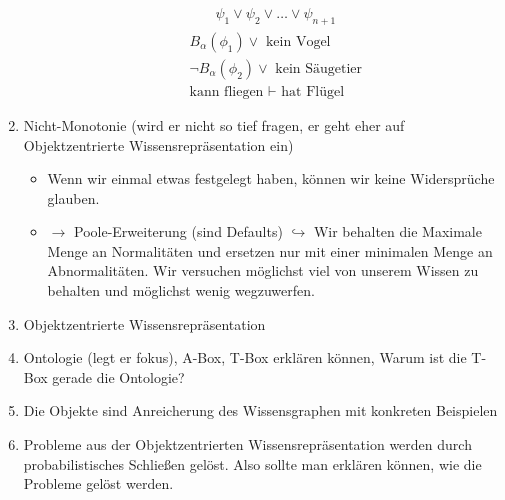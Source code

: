 \documentclass[runningheads,deutsch]{llncs}
\begin{document}
\begin{enumerate}
\begin{itemize}
\begin{align*}
            \hline
            \psi_1 \lor \psi_2 \lor \dots \lor \psi_{n+1}
        \end{align*}
        \begin{align*}
            B_\alpha(\phi_1) \lor \text{ kein Vogel} \\
            \lnot B_\alpha(\phi_2) \lor \text{ kein Säugetier} \\
            \text{kann fliegen } \vdash \text{ hat Flügel}
        \end{align*}
    \end{itemize}
    \item Nicht-Monotonie (wird er nicht so tief fragen, er geht eher auf Objektzentrierte Wissensrepräsentation ein)
    \begin{itemize}
        \item Wenn wir einmal etwas festgelegt haben, können wir keine Widersprüche glauben. 
        \item $\rightarrow$ Poole-Erweiterung (sind Defaults) $\hookrightarrow$ Wir behalten die Maximale Menge an Normalitäten und ersetzen nur mit einer minimalen Menge an Abnormalitäten. Wir versuchen möglichst viel von unserem Wissen zu behalten und möglichst wenig wegzuwerfen.
    \end{itemize}
    \item Objektzentrierte Wissensrepräsentation
    \item Ontologie (legt er fokus), A-Box, T-Box erklären können, Warum ist die T-Box gerade die Ontologie?
    \item Die Objekte sind Anreicherung des Wissensgraphen mit konkreten Beispielen
    \item Probleme aus der Objektzentrierten Wissensrepräsentation werden durch probabilistisches Schließen gelöst. Also sollte man erklären können, wie die Probleme gelöst werden.
\end{enumerate}
\end{document}
